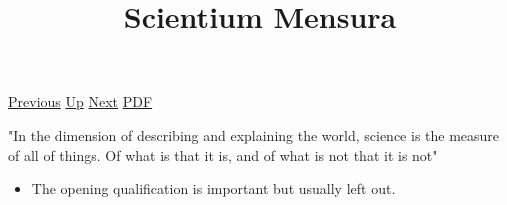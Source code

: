 \documentclass[12pt,a4paper]{report}
\begin{document}
 \href{doc/phil/People/Sellars/Quotes/Rulesarelived.html}{Previous} 
 \href{doc/phil/People/Sellars/Quotes.html}{Up} 
 \href{doc/phil/People/Sellars/Quotes/SpaceofReasons.html}{Next} 
 \href{doc/phil/People/Sellars/Quotes/ScientiumMensura.pdf}{PDF} 
\title{Scientium Mensura}
"In the dimension of describing and explaining the world, science is the measure
of all of things. Of what is that it is, and of what is not that it is not"

\cite{sellars1956empiricism}

\begin{itemize}
    \item The opening qualification is important but usually left out.
\end{itemize}



\end{document}
